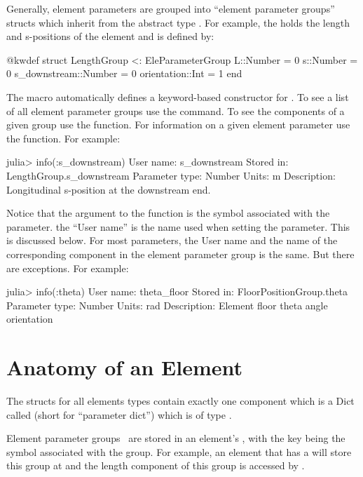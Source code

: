 Generally, element parameters are grouped into ``element parameter groups'' structs which inherit
from the abstract type .
For example, the  holds the length and s-positions of the element and is defined by:
\begin{example}
  @kwdef struct LengthGroup <: EleParameterGroup
    L::Number = 0
    s::Number = 0
    s_downstream::Number = 0
    orientation::Int = 1
  end
\end{example}
The \vn{\@kwdef} macro automatically defines a keyword-based constructor for . 
To see a list of all element parameter groups use the  command.
To see the components of a given group use the  function. For information on
a given element parameter use the  function. For example:
\begin{example}
  julia> info(:s_downstream)
    User name:       s_downstream
    Stored in:       LengthGroup.s_downstream
    Parameter type:  Number
    Units:           m
    Description:     Longitudinal s-position at the downstream end.
\end{example}
Notice that the argument to the  function is the symbol associated with the parameter.
the ``User name'' is the name used when setting the parameter. This is discussed below. For most
parameters, the User name and the name of the corresponding component in the element parameter
group is the same. But there are exceptions. For example:
\begin{example}
  julia> info(:theta)
    User name:       theta_floor
    Stored in:       FloorPositionGroup.theta
    Parameter type:  Number
    Units:           rad
    Description:     Element floor theta angle orientation
\end{example}

\section{Anatomy of an Element}
\label{s:ele.anatomy}

The structs for all elements types contain exactly one component which is a Dict called 
(short for ``parameter dict'') which is of type .

Element parameter groups~ are stored in an element's , with the key 
being the symbol associated with the group. For example, an element  that has a
 will store this group at  and the length component 
of this group is accessed by .

